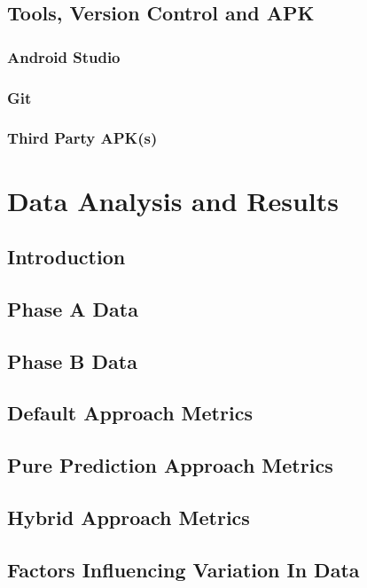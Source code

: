 \documentclass[12pt]{uthesis-v12}  %
\begin{document}
	\section{Tools, Version Control and APK}
		
		\subsection{Android Studio}
		
		\subsection{Git}
		
		\subsection{Third Party APK(s)}

\chapter{Data Analysis and Results}
	
	\section{Introduction}
	
	\section{Phase A Data}
	
	\section{Phase B Data}
	
	\section{Default Approach Metrics}
	
	\section{Pure Prediction Approach Metrics}
	
	\section{Hybrid Approach Metrics}
	
	\section{Factors Influencing Variation In Data}
		
\end{document}
